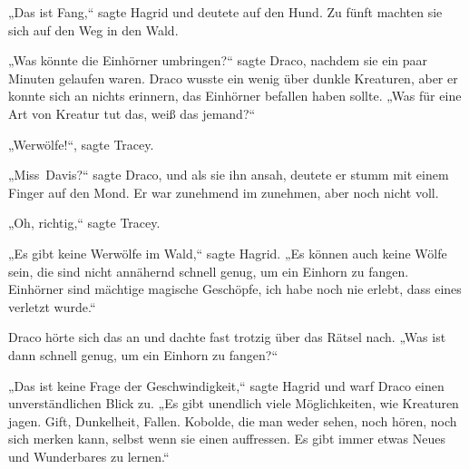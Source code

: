 „Das ist Fang,“ sagte Hagrid und deutete auf den Hund. Zu fünft machten sie sich auf den Weg in den Wald.

„Was könnte die Einhörner umbringen?“ sagte Draco, nachdem sie ein paar Minuten gelaufen waren. Draco wusste ein wenig über dunkle Kreaturen, aber er konnte sich an nichts erinnern, das Einhörner befallen haben sollte. „Was für eine Art von Kreatur tut das, weiß das jemand?“

„Werwölfe!“, sagte Tracey.

„Miss~Davis?“ sagte Draco, und als sie ihn ansah, deutete er stumm mit einem Finger auf den Mond. Er war zunehmend im zunehmen, aber noch nicht voll.

„Oh, richtig,“ sagte Tracey.

„Es gibt keine Werwölfe im Wald,“ sagte Hagrid. „Es können auch keine Wölfe sein, die sind nicht annähernd schnell genug, um ein Einhorn zu fangen. Einhörner sind mächtige magische Geschöpfe, ich habe noch nie erlebt, dass eines verletzt wurde.“

Draco hörte sich das an und dachte fast trotzig über das Rätsel nach. „Was ist dann schnell genug, um ein Einhorn zu fangen?“

„Das ist keine Frage der Geschwindigkeit,“ sagte Hagrid und warf Draco einen unverständlichen Blick zu. „Es gibt unendlich viele Möglichkeiten, wie Kreaturen jagen. Gift, Dunkelheit, Fallen. Kobolde, die man weder sehen, noch hören, noch sich merken kann, selbst wenn sie einen auffressen. Es gibt immer etwas Neues und Wunderbares zu lernen.“

